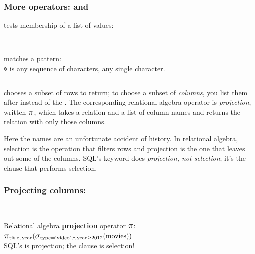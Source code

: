 \begin{frame}
    \label{s:in-like}
    \frametitle{More operators:  and }
     tests membership of a list of values:
    \inputminted[fontsize=\footnotesize]{sql}{code/sql-in.sql}
    \vspace{0.2em}
    {\scriptsize}\\[0.7em]\pause
     matches a pattern:\\
    \texttt{\%} is any sequence of characters, \code{_} any single character.
    \inputminted[fontsize=\footnotesize]{sql}{code/sql-like.sql}
    \vspace{0.2em}
    {\scriptsize}
\end{frame}
\label{l:in-like}

 chooses a subset of rows to return; to choose a subset of \emph{columns}, you list them after  instead of the \code{*}.
The corresponding relational algebra operator is \emph{projection}, written $\raop{\pi}$, which takes a relation and a list of column names and returns the relation with only those columns.

Here the names are an unfortunate accident of history.
In relational algebra, selection is the operation that filters rows and projection is the one that leaves out some of the columns.
SQL's  keyword does \emph{projection, not selection}; it's the  clause that performs selection.

\begin{frame}
    \label{s:projection}
    \frametitle{Projecting columns: }
    \inputminted[fontsize=\footnotesize]{sql}{code/sel-5-project.sql}
    \vspace{0.3em}
    {\scriptsize}\\[0.8em]
    Relational algebra \textbf{projection} operator $\raop{\pi}$:\\[0.4em]
    \hspace*{1em}$\raop{\pi}_{\ra{title},\,\ra{year}}(\raop{\sigma}_{\ra{type} = \text{`video'} \,\wedge\, \ra{year} \ge 2012}(\ra{movies}))$\\[0.8em]
    \emojiwarning{}
    SQL's  is projection; the  clause is selection!
\end{frame}
\label{l:projection}


